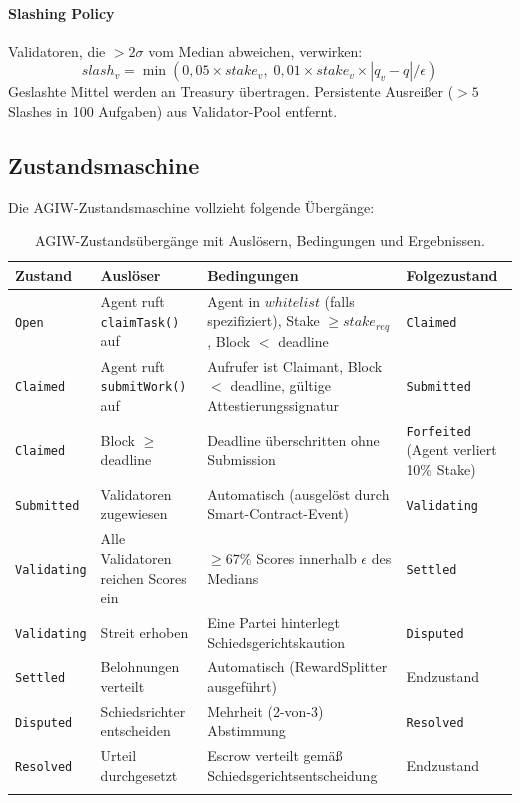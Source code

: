\documentclass[11pt]{article}
\begin{document}
\paragraph{Slashing Policy} Validatoren, die $>2\sigma$ vom Median abweichen, verwirken:
\begin{equation}
slash_v = \min(0,05 \times stake_v, \; 0,01 \times stake_v \times |q_v - q| / \epsilon)
\end{equation}
Geslashte Mittel werden an Treasury übertragen. Persistente Ausreißer ($>5$ Slashes in 100 Aufgaben) aus Validator-Pool entfernt.

\subsection{Zustandsmaschine}
\label{sec:agiw-state-machine}
Die AGIW-Zustandsmaschine vollzieht folgende Übergänge:
\begin{longtable}{@{}p{}p{}p{}p{}@{}}
\toprule
\textbf{Zustand} & \textbf{Auslöser} & \textbf{Bedingungen} & \textbf{Folgezustand} \\\midrule
\texttt{Open} & Agent ruft \texttt{claimTask()} auf & Agent in $whitelist$ (falls spezifiziert), Stake $\geq stake_{req}$, Block $<$ deadline & \texttt{Claimed} \\
\texttt{Claimed} & Agent ruft \texttt{submitWork()} auf & Aufrufer ist Claimant, Block $<$ deadline, gültige Attestierungssignatur & \texttt{Submitted} \\
\texttt{Claimed} & Block $\geq$ deadline & Deadline überschritten ohne Submission & \texttt{Forfeited} (Agent verliert 10\% Stake) \\
\texttt{Submitted} & Validatoren zugewiesen & Automatisch (ausgelöst durch Smart-Contract-Event) & \texttt{Validating} \\
\texttt{Validating} & Alle Validatoren reichen Scores ein & $\geq 67\%$ Scores innerhalb $\epsilon$ des Medians & \texttt{Settled} \\
\texttt{Validating} & Streit erhoben & Eine Partei hinterlegt Schiedsgerichtskaution & \texttt{Disputed} \\
\texttt{Settled} & Belohnungen verteilt & Automatisch (RewardSplitter ausgeführt) & Endzustand \\
\texttt{Disputed} & Schiedsrichter entscheiden & Mehrheit (2-von-3) Abstimmung & \texttt{Resolved} \\
\texttt{Resolved} & Urteil durchgesetzt & Escrow verteilt gemäß Schiedsgerichtsentscheidung & Endzustand \\\bottomrule
\caption{AGIW-Zustandsübergänge mit Auslösern, Bedingungen und Ergebnissen.}
\label{tab:agiw-states}
\end{longtable}
\end{document}
